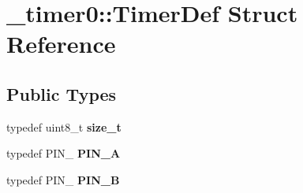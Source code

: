 \hypertarget{struct__timer0_1_1TimerDef}{}\section{\+\_\+timer0\+:\+:Timer\+Def Struct Reference}
\label{struct__timer0_1_1TimerDef}
\subsection*{Public Types}
\begin{DoxyCompactItemize}
\item 
typedef uint8\+\_\+t {\bfseries size\+\_\+t}\hypertarget{struct__timer0_1_1TimerDef_ac97e10949ae7dd8703568e7accb4346c}{}\label{struct__timer0_1_1TimerDef_ac97e10949ae7dd8703568e7accb4346c}

\item 
typedef P\+I\+N\+\_ {\bfseries P\+I\+N\+\_\+A}\hypertarget{struct__timer0_1_1TimerDef_ab4f68d388e3b8fdd3e07032692c793a4}{}\label{struct__timer0_1_1TimerDef_ab4f68d388e3b8fdd3e07032692c793a4}

\item 
typedef P\+I\+N\+\_ {\bfseries P\+I\+N\+\_\+B}\hypertarget{struct__timer0_1_1TimerDef_acb1e52236e26a885f377ab78b88cfc9c}{}\label{struct__timer0_1_1TimerDef_acb1e52236e26a885f377ab78b88cfc9c}

\end{DoxyCompactItemize}
